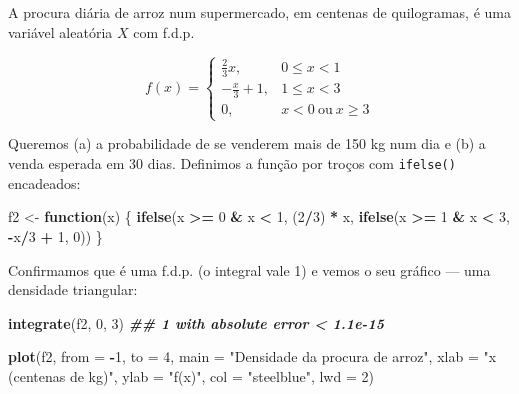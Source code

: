 \documentclass[
  portuguese,
  11pt,
  openany]{book}
\newenvironment{Shaded}{\begin{snugshade}}{\end{snugshade}}
\newcommand{\AttributeTok}[1]{\textcolor[rgb]{0.13,0.29,0.53}{#1}}
\newcommand{\ControlFlowTok}[1]{\textcolor[rgb]{0.13,0.29,0.53}{\textbf{#1}}}
\newcommand{\DecValTok}[1]{\textcolor[rgb]{0.00,0.00,0.81}{#1}}
\newcommand{\DocumentationTok}[1]{\textcolor[rgb]{0.56,0.35,0.01}{\textbf{\textit{#1}}}}
\newcommand{\FunctionTok}[1]{\textcolor[rgb]{0.13,0.29,0.53}{\textbf{#1}}}
\newcommand{\NormalTok}[1]{#1}
\newcommand{\OtherTok}[1]{\textcolor[rgb]{0.56,0.35,0.01}{#1}}
\newcommand{\SpecialCharTok}[1]{\textcolor[rgb]{0.81,0.36,0.00}{\textbf{#1}}}
\newcommand{\StringTok}[1]{\textcolor[rgb]{0.31,0.60,0.02}{#1}}
\begin{document}
A procura diária de arroz num supermercado, em centenas de quilogramas, é uma variável
aleatória \(X\) com f.d.p.

\[f(x) = \begin{cases}
\frac{2}{3}x, & 0 \leq x < 1 \\[4pt]
-\frac{x}{3} + 1, & 1 \leq x < 3 \\[4pt]
0, & x < 0 \ \text{ou} \ x \geq 3
\end{cases}\]

Queremos (a) a probabilidade de se venderem mais de 150 kg num dia e (b) a venda
esperada em 30 dias. Definimos a função por troços com \texttt{ifelse()} encadeados:

\begin{Shaded}
\begin{Highlighting}[]
\NormalTok{f2 }\OtherTok{\textless{}{-}} \ControlFlowTok{function}\NormalTok{(x) \{}
  \FunctionTok{ifelse}\NormalTok{(x }\SpecialCharTok{\textgreater{}=} \DecValTok{0} \SpecialCharTok{\&}\NormalTok{ x }\SpecialCharTok{\textless{}} \DecValTok{1}\NormalTok{, (}\DecValTok{2}\SpecialCharTok{/}\DecValTok{3}\NormalTok{) }\SpecialCharTok{*}\NormalTok{ x,}
         \FunctionTok{ifelse}\NormalTok{(x }\SpecialCharTok{\textgreater{}=} \DecValTok{1} \SpecialCharTok{\&}\NormalTok{ x }\SpecialCharTok{\textless{}} \DecValTok{3}\NormalTok{, }\SpecialCharTok{{-}}\NormalTok{x}\SpecialCharTok{/}\DecValTok{3} \SpecialCharTok{+} \DecValTok{1}\NormalTok{, }\DecValTok{0}\NormalTok{))}
\NormalTok{\}}
\end{Highlighting}
\end{Shaded}

Confirmamos que é uma f.d.p. (o integral vale 1) e vemos o seu gráfico --- uma densidade
triangular:

\begin{Shaded}
\begin{Highlighting}[]
\FunctionTok{integrate}\NormalTok{(f2, }\DecValTok{0}\NormalTok{, }\DecValTok{3}\NormalTok{)}
\DocumentationTok{\#\# 1 with absolute error \textless{} 1.1e{-}15}

\FunctionTok{plot}\NormalTok{(f2, }\AttributeTok{from =} \SpecialCharTok{{-}}\DecValTok{1}\NormalTok{, }\AttributeTok{to =} \DecValTok{4}\NormalTok{,}
     \AttributeTok{main =} \StringTok{"Densidade da procura de arroz"}\NormalTok{,}
     \AttributeTok{xlab =} \StringTok{"x (centenas de kg)"}\NormalTok{, }\AttributeTok{ylab =} \StringTok{"f(x)"}\NormalTok{, }\AttributeTok{col =} \StringTok{"steelblue"}\NormalTok{, }\AttributeTok{lwd =} \DecValTok{2}\NormalTok{)}
\end{Highlighting}
\end{Shaded}
\end{document}
